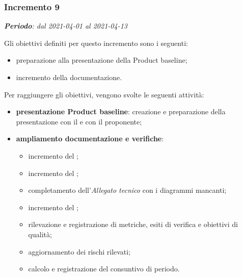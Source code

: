 \subsubsection{Incremento 9}
\textit{\textbf{Periodo}: dal 2021-04-01 al 2021-04-13}

Gli obiettivi definiti per questo incremento sono i seguenti:
\begin{itemize}
\item preparazione alla presentazione della Product baseline;
\item incremento della documentazione.
\end{itemize}

Per raggiungere gli obiettivi, vengono svolte le seguenti attività:
\begin{itemize}
\item \textbf{presentazione Product baseline}: creazione e preparazione della presentazione con il \CR{} e con il proponente;
\item \textbf{ampliamento documentazione e verifiche}:
\begin{itemize}
\item incremento del \MU{};
\item incremento del \MM{};
\item completamento dell'\textit{Allegato tecnico} con i diagrammi mancanti;
\item incremento del ;
\item rilevazione e registrazione di metriche, esiti di verifica e obiettivi di qualità;
\item aggiornamento dei rischi rilevati;
\item calcolo e registrazione del consuntivo di periodo.
\end{itemize}

\end{itemize}
